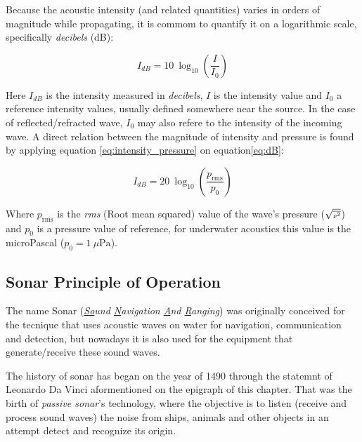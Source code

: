 

Because the acoustic intensity (and related quantities) varies in orders of
magnitude while propagating, it is commom to quantify it on a logarithmic scale,
specifically \textit{decibels} (dB)\cite{LURTON}:

\begin{equation}\label{eq:dB}
I_{dB} = 10~\log_{10}\left(\frac{I}{I_0}\right)
\end{equation} 

Here $I_{dB}$ is the intensity measured in \textit{decibels}, $I$ is the
intensity value and $I_0$ a reference intensity values, usually defined somewhere near the
source. In the case of reflected/refracted wave, $I_0$ may also refere to
the intensity of the incoming wave. A direct relation between the magnitude of
intensity and pressure is found by applying equation \ref{eq:intensity_pressure}
on equation\ref{eq:dB}:

\begin{equation}\label{eq:dB2}
I_{dB} = 20~\log_{10}\left(\frac{p_{\text{rms}}}{p_0}\right)
\end{equation}

Where $p_{\text{rms}}$ is the \textit{rms} (Root mean squared) value of the
wave's pressure ({\small $\sqrt{\text{\tiny \(\overline{p^2}\)}}$}) and $p_0$ is
a pressure value of reference, for underwater acoustics this value is the
microPascal (\(p_0 = 1~\mu\text{Pa} \))\cite{LURTON}.


\subsection{Sonar Principle of Operation}

The name Sonar (\textit{\underline{So}und \underline{N}avigation \underline{A}nd
\underline{R}anging}) was originally conceived for the tecnique that uses
acoustic waves on water for navigation, communication and detection, but
nowadays it is also used for the equipment that generate/receive these
sound waves.

The history of sonar has began on the year of 1490 through
the statemnt of Leonardo Da Vinci aformentioned on the epigraph 
of this chapter\cite{fahy1998fundamentals}. That was the birth of
\textit{passive sonar}'s technology, where the objective is to listen (receive
and process sound waves) the noise from ships, animals and other objects in an attempt detect and
recognize its origin.


